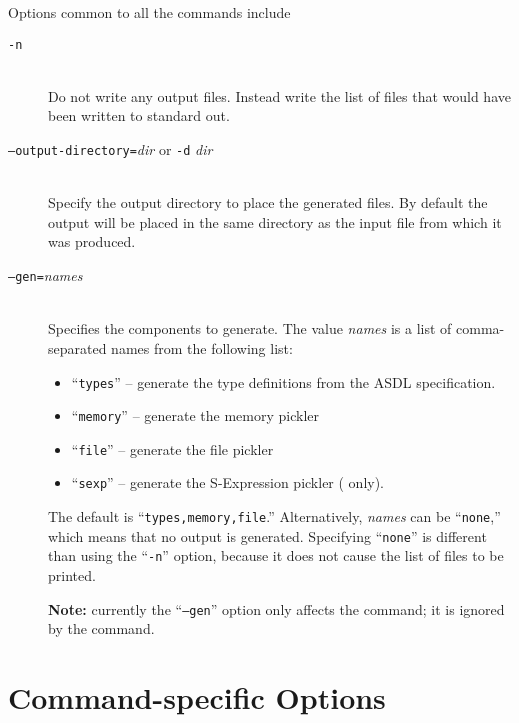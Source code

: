 Options common to all the commands include
\begin{description}
  \item[\normalfont\texttt{-n}] \mbox{}\\
    Do not write any output files.
    Instead write the list of files that would have been written to standard out.
  \item[\normalfont\texttt{--output-directory=}\textit{dir} or \texttt{-d} \textit{dir}] \mbox{}\\
    Specify the output directory to place the generated files.
    By default the output will be placed in the same directory as the
    input file from which it was produced.
  \item[\normalfont\texttt{--gen=}\textit{names}] \mbox{}\\
    Specifies the components to generate.  The value \textit{names} is a list of
    comma-separated names from the following list:
    \begin{itemize}
      \item ``\texttt{types}'' -- generate the type definitions from the ASDL specification.
      \item ``\texttt{memory}'' -- generate the memory pickler
      \item ``\texttt{file}'' -- generate the file pickler
      \item ``\texttt{sexp}'' -- generate the S-Expression pickler (\sml{} only).
    \end{itemize}%
    The default is ``\texttt{types,memory,file}.''
    Alternatively, \textit{names} can be ``\texttt{none},'' which means that
    no output is generated.  Specifying
    ``\texttt{none}'' is different than using the ``\texttt{-n}'' option, because
    it does not cause the list of files to be printed.

    \textbf{Note:} currently the ``\texttt{--gen}'' option only affects the \sml{}
    command; it is ignored by the \Cplusplus{} command.
\end{description}%

\section*{Command-specific Options}

